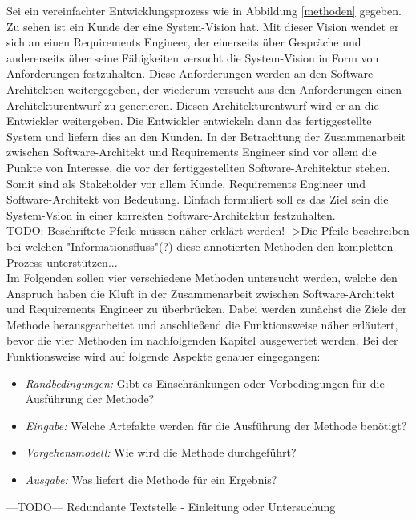 Sei ein vereinfachter Entwicklungsprozess wie in Abbildung \ref{methoden} gegeben. Zu sehen ist ein Kunde der eine System-Vision hat. Mit dieser Vision wendet er sich an einen Requirements Engineer, der einerseits \"uber Gespr\"ache und andererseits \"uber seine F\"ahigkeiten versucht die System-Vision in Form von Anforderungen festzuhalten. Diese Anforderungen werden an den Software-Architekten weitergegeben, der wiederum versucht aus den Anforderungen einen Architekturentwurf zu generieren. Diesen Architekturentwurf wird er an die Entwickler weitergeben. Die Entwickler entwickeln dann das fertiggestellte System und liefern dies an den Kunden. In der Betrachtung der Zusammenarbeit zwischen Software-Architekt und Requirements Engineer sind vor allem die Punkte von Interesse, die vor der fertiggestellten Software-Architektur stehen. Somit sind als Stakeholder vor allem Kunde, Requirements Engineer und Software-Architekt von Bedeutung. Einfach formuliert soll es das Ziel sein die System-Vsion in einer korrekten Software-Architektur festzuhalten.\\

TODO: Beschriftete Pfeile müssen näher erklärt werden! ->Die Pfeile beschreiben bei welchen "Informationsfluss"(?) diese annotierten Methoden den kompletten Prozess unterstützen...  \\

Im Folgenden sollen vier verschiedene Methoden untersucht werden, welche den Anspruch haben die Kluft in der Zusammenarbeit zwischen Software-Architekt und Requirements Engineer zu \"uberbr\"ucken. Dabei werden zun\"achst die Ziele der Methode herausgearbeitet und anschlie\ss{}end die Funktionsweise n\"aher erl\"autert, bevor die vier Methoden im nachfolgenden Kapitel ausgewertet werden. Bei der Funktionsweise wird auf folgende Aspekte genauer eingegangen: \\

\begin{itemize}
\item \textit{Randbedingungen:} Gibt es Einschr\"ankungen oder Vorbedingungen f\"ur die Ausf\"uhrung der Methode?
\item \textit{Eingabe:} Welche Artefakte werden f\"ur die Ausf\"uhrung der Methode ben\"otigt?
\item \textit{Vorgehensmodell:} Wie wird die Methode durchgef\"uhrt?
\item \textit{Ausgabe:} Was liefert die Methode f\"ur ein Ergebnis? \\
\end{itemize}

---TODO--- Redundante Textstelle - Einleitung oder Untersuchung\\




